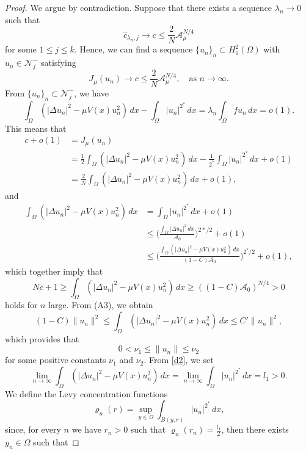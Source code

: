 \documentclass[reqno]{amsart}
\begin{document}
\begin{proof}
We argue by contradiction. Suppose that there exists a sequence \(\lambda_n\to 0\) 
such that
 \[
 \hat{c}_{\lambda_n,j}\to c\leq \frac{2}{N}\mathcal{A}_{\mu}^{N/4}
 \]
for some \(1\leq j\leq k\). Hence, we can find a sequence 
\(\{u_n\}_n\subset H^2_0(\Omega)\) with \(u_n\in \mathcal{N}^-_j\) satisfying
\begin{equation}\label{d1}
 J_\mu(u_n)\to c\leq \frac{2}{N}\mathcal{A}_{\mu}^{N/4}, \quad\text{as }
  n\to \infty.
\end{equation}
From $\{u_n\}_n\subset \mathcal{N}^-_j$, we have
\begin{equation}\label{d2}
 \int_{\Omega}(|\Delta u_n|^2-\mu V(x)u_n^2)\,dx
 - \int_{\Omega} |u_n|^{2^*}\,dx=\lambda_n \int_{\Omega} fu_n \,dx=o(1).
 \end{equation}
This means that
\begin{align*}
 c+o(1)&=J_\mu(u_n)\\
 &=\frac{1}{2}\int_{\Omega}(|\Delta u_n|^2-\mu V(x)u_n^2)\,dx-\frac{1}{2^*} \int_{\Omega} |u_n|^{2^*}\,dx+o(1)\\
 &=\frac{2}{N}\int_{\Omega}(|\Delta u_n|^2-\mu V(x)u_n^2)\,dx+o(1),
\end{align*}
and
 \begin{align*}
 \int_{\Omega}(|\Delta u_n|^2-\mu V(x)u_n^2)\,dx&=\int_{\Omega} |u_n|^{2^*}\,dx+o(1)\\
 &\leq \Big( \frac{\int_{\Omega}|\Delta u_n|^2\,dx}{\mathcal{A}_0}\Big) ^{2*/2}+o(1)\\
 &\leq \Big( \frac{\int_{\Omega}(|\Delta u_n|^2-\mu V(x)u_n^2)\,dx}{(1-C)\mathcal{A}_0}
 \Big) ^{2^*/2}+o(1),
 \end{align*}
 which together imply that
 \[
 Nc+1\geq \int_{\Omega}(|\Delta u_n|^2-\mu V(x)u_n^2)\,dx\geq \left( (1-C)\mathcal{A}_0\right) ^{N/4}>0
 \]
holds for \(n\) large. From (A3), we obtain
\[
 (1-C)\|u_n\|^2\leq \int_{\Omega}(|\Delta u_n|^2-\mu V(x)u_n^2)\,dx \leq C'\|u_n\|^2,
\]
which provides that
\begin{equation}\label{d3}
 0<\nu_1\leq \|u_n\|\leq \nu_2
\end{equation}
for some positive constants $\nu_1$ and $\nu_2$. From \eqref{d2}, we set
\[
 \lim_{n\to \infty}\int_{\Omega}(|\Delta u_n|^2-\mu V(x)u_n^2)\,dx
 =\lim_{n\to \infty} \int_{\Omega} |u_n|^{2^*}\,dx=l_1>0.
\]
We define the Levy concentration functions
\[
 \varrho_n(r)=\sup_{y\in \Omega}\int _{B(y, r)}|u_n|^{2^*}\,dx,
\]
since, for every $n$ we have $r_n>0$ such that \(\varrho_n(r_n)=\frac{l_1}{2}\), then there exists \(y_n\in \Omega\) such that

\end{proof}
\end{document}
